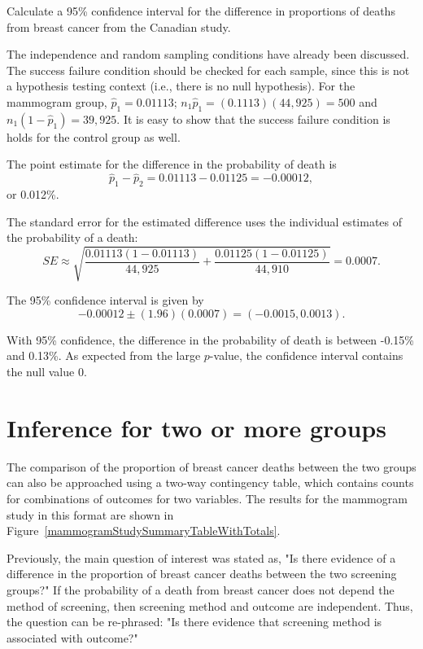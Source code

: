 \begin{examplewrap}
\begin{nexample}{Calculate a 95\% confidence interval for the difference in proportions of deaths from breast cancer from the Canadian study.}\label{mammogramExConfInt}%

The independence and random sampling conditions have already been discussed.  The success failure condition should be checked for each sample, since this is not a hypothesis testing context (i.e., there is no null hypothesis). For the mammogram group, $\hat{p}_1 = 0.01113$; $n_1 \hat{p}_1 = (0.1113)(44,925) = 500$ and $n_1 (1 - \hat{p}_1) = 39,925.$ It is easy to show that the success failure condition is holds for the control group as well.

The point estimate for the difference in the probability of death is
$$\hat{p}_{1} - \hat{p}_{2} = 0.01113 - 0.01125 = -0.00012,$$ or 0.012\%.

The standard error for the estimated difference uses the individual estimates of the probability of a death:
$$SE \approx \sqrt{\frac{0.01113(1-0.01113)}{44,925} + \frac{0.01125(1-0.01125)}{44,910}} = 0.0007. $$

The 95\% confidence interval is given by
$$ -0.00012 \pm (1.96) (0.0007) = (-0.0015, 0.0013).$$

With 95\% confidence, the difference in the probability of death is between -0.15\% and 0.13\%. As expected from the large $p$-value, the confidence interval contains the null value 0.
\end{nexample}
\end{examplewrap}



\section{Inference for two or more groups}
\label{twoWayTablesAndChiSquare}

The comparison of the proportion of breast cancer deaths between the two groups can also be approached using a two-way contingency table, which contains counts for combinations of outcomes for two variables. The results for the mammogram study in this format are shown in Figure~\ref{mammogramStudySummaryTableWithTotals}.

Previously, the main question of interest was stated as, "Is there evidence of a difference in the proportion of breast cancer deaths between the two screening groups?" If the probability of a death from breast cancer does not depend the method of screening, then screening method and outcome are independent. Thus, the question can be re-phrased: "Is there evidence that screening method is associated with outcome?"

